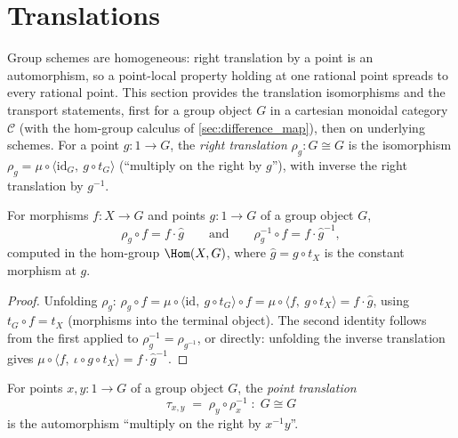\section{Translations}
\label{sec:translations}

Group schemes are homogeneous: right translation by a point is an
automorphism, so a point-local property holding at one rational point spreads
to every rational point. This section provides the translation isomorphisms
and the transport statements, first for a group object \(G\) in a cartesian
monoidal category \(\mathcal C\) (with the hom-group calculus of
\ref{sec:difference_map}), then on underlying schemes. For a point
\(g : 1 \to G\), the \emph{right translation} \(\rho_g : G \cong G\) is the
isomorphism \(\rho_g = \mu \circ \langle \mathrm{id}_G,\ g \circ t_G\rangle\)
(``multiply on the right by \(g\)''), with inverse the right translation by
\(g^{-1}\).

\begin{lemma}
  \label{lem:comp_mulRight}
  \leanok
  For morphisms \(f : X \to G\) and points \(g : 1 \to G\) of a group object
  \(G\),
  \[
    \rho_g \circ f = f \cdot \hat g
    \qquad\text{and}\qquad
    \rho_g^{-1} \circ f = f \cdot \hat g^{-1},
  \]
  computed in the hom-group \(\Hom(X, G)\), where
  \(\hat g = g \circ t_X\) is the constant morphism at \(g\).
\end{lemma}
\begin{proof}
  \leanok
  Unfolding \(\rho_g\): \(\rho_g \circ f = \mu \circ \langle \mathrm{id},\ g
  \circ t_G\rangle \circ f = \mu \circ \langle f,\ g \circ t_X\rangle
  = f \cdot \hat g\), using \(t_G \circ f = t_X\) (morphisms into the terminal
  object). The second identity follows from the first applied to
  \(\rho_g^{-1} = \rho_{g^{-1}}\), or directly: unfolding the inverse
  translation gives \(\mu \circ \langle f,\ \iota \circ g \circ t_X\rangle =
  f \cdot \hat g^{-1}\).
\end{proof}

\begin{definition}
  \label{def:point_translation}
  \leanok
  For points \(x, y : 1 \to G\) of a group object \(G\), the
  \emph{point translation}
  \[
    \tau_{x,y} \;=\; \rho_y \circ \rho_x^{-1} \;:\; G \cong G
  \]
  is the automorphism ``multiply on the right by \(x^{-1} y\)''.
\end{definition}

